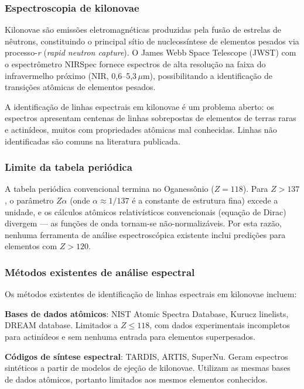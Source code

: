 \documentclass[12pt,a4paper]{article}
\begin{document}
\subsubsection{Espectroscopia de kilonovae}

Kilonovae são emissões eletromagnéticas produzidas pela fusão de
estrelas de nêutrons, constituindo o principal sítio de
nucleossíntese de elementos pesados via processo-\textit{r}
(\textit{rapid neutron capture}). O James Webb Space Telescope
(JWST) com o espectrômetro NIRSpec fornece espectros de alta
resolução na faixa do infravermelho próximo (NIR, 0,6--5,3\,$\mu$m),
possibilitando a identificação de transições atômicas de elementos
pesados.

A identificação de linhas espectrais em kilonovae é um problema
aberto: os espectros apresentam centenas de linhas sobrepostas de
elementos de terras raras e actinídeos, muitos com propriedades
atômicas mal conhecidas. Linhas não identificadas são comuns na
literatura publicada.

\subsubsection{Limite da tabela periódica}

A tabela periódica convencional termina no Oganessônio ($Z = 118$).
Para $Z > 137$, o parâmetro $Z\alpha$ (onde $\alpha \approx 1/137$
é a constante de estrutura fina) excede a unidade, e os cálculos
atômicos relativísticos convencionais (equação de Dirac) divergem
--- as funções de onda tornam-se não-normalizáveis. Por esta razão,
nenhuma ferramenta de análise espectroscópica existente inclui
predições para elementos com $Z > 120$.

\subsubsection{Métodos existentes de análise espectral}

Os métodos existentes de identificação de linhas espectrais em
kilonovae incluem:

\textbf{Bases de dados atômicos}: NIST Atomic Spectra Database,
Kurucz linelists, DREAM database. Limitados a $Z \leq 118$, com
dados experimentais incompletos para actinídeos e sem nenhuma
entrada para elementos superpesados.

\textbf{Códigos de síntese espectral}: TARDIS, ARTIS, SuperNu.
Geram espectros sintéticos a partir de modelos de ejeção de
kilonovae. Utilizam as mesmas bases de dados atômicos, portanto
limitados aos mesmos elementos conhecidos.
\end{document}
